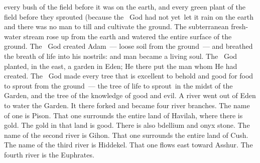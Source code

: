 \begin{inparaenum}
   every bush of the field before it was on the earth, and every green plant of the field before they sprouted (because the \lord\ God had not yet\understood\ let it rain on the earth and there was no man to till and cultivate the ground.%
   The subterranean fresh-water stream rose up from the earth and watered the entire surface of the ground.%
   The \lord\ God created Adam~--- loose soil from the ground~--- and breathed the breath of life into his nostrils: and man became a living soul.%
   The \lord\ God planted, in the east, a garden in Eden; He there put the man whom He had created.%
   The \lord\ God made every tree that is excellent to behold and good for food to sprout from the ground~--- the tree of life to sprout\understood\ in the midst of the Garden, and the tree of the knowledge of good and evil.%
   A river went out of Eden to water the Garden. It there forked and became four river branches.%
   The name of one is Pison. That one surrounds the entire land of Havilah, where there is gold.%
   The gold in that land is good. There is also bdellium and onyx stone.%
   The name of the second river is Gihon. That one surrounds the entire land of Cush.%
   The name of the third river is Hiddekel. That one flows east toward Asshur. The fourth river is the Euphrates.%

\end{inparaenum}
